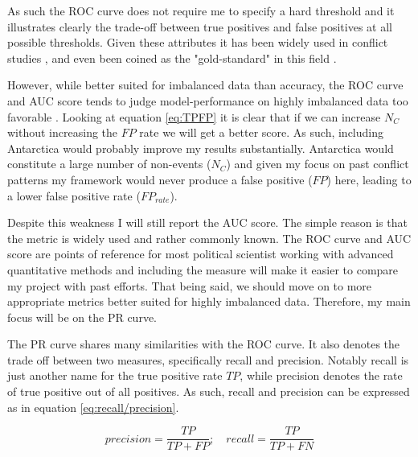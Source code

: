 \documentclass[a4paper]{article}
\begin{document}
As such the ROC curve does not require me to specify a hard threshold and it illustrates clearly the trade-off between true positives and false positives at all possible thresholds. Given these attributes it has been widely used in conflict studies \citep[14]{chadefaux2017conflict}, and even been coined as the "gold-standard" in this field \citep[366]{perry_2013}. 

However, while better suited for imbalanced data than accuracy, the ROC curve and AUC score tends to judge model-performance on highly imbalanced data too favorable \citep[1278]{He_2008}. Looking at equation \ref{eq:TPFP} it is clear that if we can increase $N_C$ without increasing the $FP$ rate we will get a better score. As such, including Antarctica would probably improve my results substantially. Antarctica would constitute a large number of non-events ($N_C$) and given my focus on past conflict patterns my framework would never produce a false positive ($FP$) here, leading to a lower false positive rate ($FP_{rate}$).\par

Despite this weakness I will still report the AUC score. The simple reason is that the metric is widely used and rather commonly known. The ROC curve and AUC score are points of reference for most political scientist working with advanced quantitative methods and including the measure will make it easier to compare my project with past efforts. That being said, we should move on to more appropriate metrics better suited for highly imbalanced data. Therefore, my main focus will be on the PR curve.\par

The PR curve shares many similarities with the ROC curve. It also denotes the trade off between two measures, specifically recall and precision. Notably recall is just another name for the true positive rate $TP$, while precision denotes the rate of true positive out of all positives. As such, recall and
precision can be expressed as in equation \ref{eq:recall/precision}.\par%

\[
precision = \frac{TP}{TP+FP}; \quad recall = \frac{TP}{TP+FN} \tag{16} \label{eq:recall/precision}
\]

\end{document}
